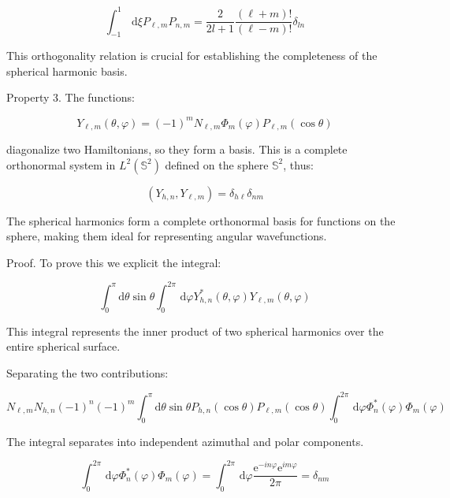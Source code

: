 \documentclass[italian]{HKNdocument}
\begin{document}
\begin{equation}
\int_{-1}^{1} \, \mathrm{d} \xi P_{\ell, m} P_{n, m}=\frac{2}{2 l+1} \frac{(\ell+m)!}{(\ell-m)!} \delta_{l n} \label{eq:8.48}
\end{equation}

This orthogonality relation is crucial for establishing the completeness of the spherical harmonic basis.

Property 3. The functions:

\begin{equation}
Y_{\ell, m}(\theta, \varphi)=(-1)^{m} N_{\ell, m} \Phi_{m}(\varphi) P_{\ell, m}(\cos \theta) \label{eq:8.49}
\end{equation}

diagonalize two Hamiltonians, so they form a basis. This is a complete orthonormal system in $L^{2}\left(\mathbb{S}^{2}\right)$ defined on the sphere $\mathbb{S}^{2}$, thus:

\begin{equation}
\left(Y_{h, n}, Y_{\ell, m}\right)=\delta_{h \ell} \delta_{n m} \label{eq:8.50}
\end{equation}

The spherical harmonics form a complete orthonormal basis for functions on the sphere, making them ideal for representing angular wavefunctions.

Proof. To prove this we explicit the integral:

\begin{equation}
\int_{0}^{\pi} \mathrm{d} \theta \sin \theta \int_{0}^{2 \pi} \, \mathrm{d} \varphi Y_{h, n}^{*}(\theta, \varphi) Y_{\ell, m}(\theta, \varphi) \label{eq:8.51}
\end{equation}

This integral represents the inner product of two spherical harmonics over the entire spherical surface.

Separating the two contributions:

\begin{equation}
N_{\ell, m} N_{h, n}(-1)^{n}(-1)^{m} \int_{0}^{\pi} \mathrm{d} \theta \sin \theta P_{h, n}(\cos \theta) P_{\ell, m}(\cos \theta) \int_{0}^{2 \pi} \, \mathrm{d} \varphi \Phi_{n}^{*}(\varphi) \Phi_{m}(\varphi) \label{eq:8.52}
\end{equation}

The integral separates into independent azimuthal and polar components.

\begin{equation}
\int_{0}^{2 \pi} \, \mathrm{d} \varphi \Phi_{n}^{*}(\varphi) \Phi_{m}(\varphi)=\int_{0}^{2 \pi} \, \mathrm{d} \varphi \frac{\mathrm{e}^{-i n \varphi} \mathrm{e}^{i m \varphi}}{2 \pi}=\delta_{n m} \label{eq:8.53}
\end{equation}
\end{document}
